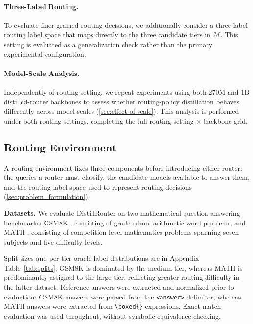 \documentclass{article}
\begin{document}
\paragraph{Three-Label Routing.} To evaluate finer-grained routing decisions, we additionally consider a three-label routing label space that maps directly to the three candidate tiers in $\mathcal{M}$. This setting is evaluated as a generalization check rather than the primary experimental configuration.

\paragraph{Model-Scale Analysis.}
\label{sec:scaling-generalization}
Independently of routing setting, we repeat experiments using both 270M and 1B distilled-router backbones to assess whether routing-policy distillation behaves differently across model scales (\ref{sec:effect-of-scale}). This analysis is performed under both routing settings, completing the full routing-setting $\times$ backbone grid.

\subsection{Routing Environment}
\label{sec:datasets}

A routing environment fixes three components before introducing either router: the queries a router must classify, the candidate models available to answer them, and the routing label space used to represent routing decisions (\ref{sec:problem_formulation}).

\textbf{Datasets.} We evaluate DistillRouter on two mathematical question-answering benchmarks: GSM8K \citep{cobbe2021training}, consisting of grade-school arithmetic word problems, and MATH \mbox{\citep{hendrycks2021measuring}}, consisting of competition-level mathematics problems spanning seven subjects and five difficulty levels.

Split sizes and per-tier oracle-label distributions are in Appendix Table~\ref{tab:splits}; GSM8K is dominated by the medium tier, whereas MATH is predominantly assigned to the large tier, reflecting greater routing difficulty in the latter dataset. Reference answers were extracted and normalized prior to evaluation: GSM8K answers were parsed from the \verb|<answer>| delimiter, whereas MATH answers were extracted from \verb|\boxed{}| expressions. Exact-match evaluation was used throughout, without symbolic-equivalence checking.
\end{document}
